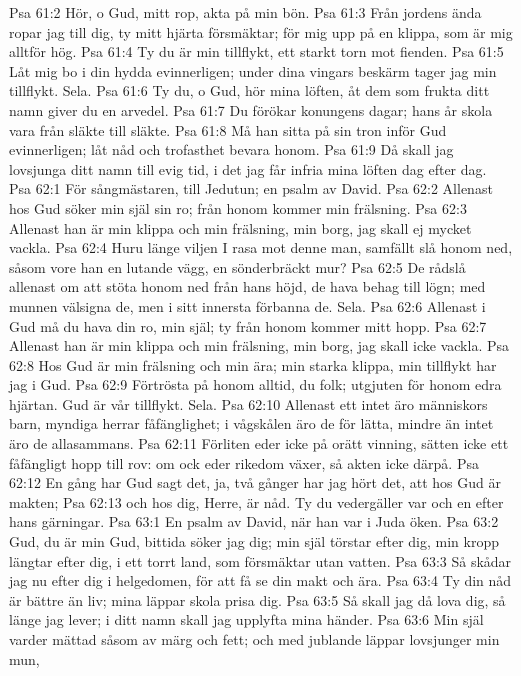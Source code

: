 Psa 61:2  Hör, o Gud, mitt rop, akta på min bön.
Psa 61:3  Från jordens ända ropar jag till dig, ty mitt hjärta försmäktar; för mig upp på en klippa, som är mig alltför hög.
Psa 61:4  Ty du är min tillflykt, ett starkt torn mot fienden.
Psa 61:5  Låt mig bo i din hydda evinnerligen; under dina vingars beskärm tager jag min tillflykt. Sela.
Psa 61:6  Ty du, o Gud, hör mina löften, åt dem som frukta ditt namn giver du en arvedel.
Psa 61:7  Du förökar konungens dagar; hans år skola vara från släkte till släkte.
Psa 61:8  Må han sitta på sin tron inför Gud evinnerligen; låt nåd och trofasthet bevara honom.
Psa 61:9  Då skall jag lovsjunga ditt namn till evig tid, i det jag får infria mina löften dag efter dag.
Psa 62:1  För sångmästaren, till Jedutun; en psalm av David.
Psa 62:2  Allenast hos Gud söker min själ sin ro; från honom kommer min frälsning.
Psa 62:3  Allenast han är min klippa och min frälsning, min borg, jag skall ej mycket vackla.
Psa 62:4  Huru länge viljen I rasa mot denne man, samfällt slå honom ned, såsom vore han en lutande vägg, en sönderbräckt mur?
Psa 62:5  De rådslå allenast om att stöta honom ned från hans höjd, de hava behag till lögn; med munnen välsigna de, men i sitt innersta förbanna de. Sela.
Psa 62:6  Allenast i Gud må du hava din ro, min själ; ty från honom kommer mitt hopp.
Psa 62:7  Allenast han är min klippa och min frälsning, min borg, jag skall icke vackla.
Psa 62:8  Hos Gud är min frälsning och min ära; min starka klippa, min tillflykt har jag i Gud.
Psa 62:9  Förtrösta på honom alltid, du folk; utgjuten för honom edra hjärtan. Gud är vår tillflykt. Sela.
Psa 62:10  Allenast ett intet äro människors barn, myndiga herrar fåfänglighet; i vågskålen äro de för lätta, mindre än intet äro de allasammans.
Psa 62:11  Förliten eder icke på orätt vinning, sätten icke ett fåfängligt hopp till rov: om ock eder rikedom växer, så akten icke därpå.
Psa 62:12  En gång har Gud sagt det, ja, två gånger har jag hört det, att hos Gud är makten;
Psa 62:13  och hos dig, Herre, är nåd. Ty du vedergäller var och en efter hans gärningar.
Psa 63:1  En psalm av David, när han var i Juda öken.
Psa 63:2  Gud, du är min Gud, bittida söker jag dig; min själ törstar efter dig, min kropp längtar efter dig, i ett torrt land, som försmäktar utan vatten.
Psa 63:3  Så skådar jag nu efter dig i helgedomen, för att få se din makt och ära.
Psa 63:4  Ty din nåd är bättre än liv; mina läppar skola prisa dig.
Psa 63:5  Så skall jag då lova dig, så länge jag lever; i ditt namn skall jag upplyfta mina händer.
Psa 63:6  Min själ varder mättad såsom av märg och fett; och med jublande läppar lovsjunger min mun,
